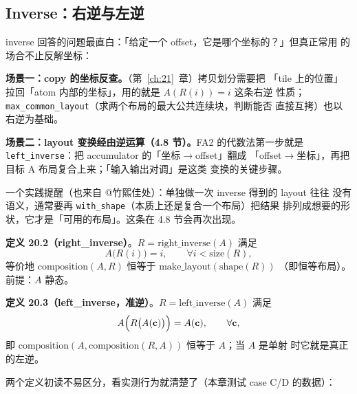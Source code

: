 \subsection{Inverse：右逆与左逆}

inverse 回答的问题最直白：「给定一个 offset，它是哪个坐标的？」但真正常用
的场合不止反解坐标：

\textbf{场景一：copy 的坐标反查。}（第~\ref{ch:21}~章）拷贝划分需要把
「tile 上的位置」拉回「atom 内部的坐标」，用的就是 $A(R(i))=i$ 这条右逆
性质；\texttt{max\_\allowbreak{}common\_\allowbreak{}layout}（求两个布局的最大公共连续块，判断能否
直接互拷）也以右逆为基础。

\textbf{场景二：layout 变换经由逆运算（4.8 节）。}\allowbreak{}FA2 的代数法第一步就是
\texttt{left\_\allowbreak{}inverse}：把 accumulator 的「坐标$\to$offset」翻成
「offset$\to$坐标」，再把目标 A 布局复合上来；「输入输出对调」是这类
变换的关键步骤。

一个实践提醒（也来自 @竹熙佳处）：单独做一次 inverse 得到的 layout 往往
没有语义，通常要再 \texttt{with\_shape}（本质上还是复合一个布局）把结果
排列成想要的形状，它才是「可用的布局」。这条在 4.8 节会再次出现。

\textbf{定义 20.2（right\_inverse）}。$R=\mathrm{right\_inverse}(A)$ 满足
\begin{equation}
  A\bigl(R(i)\bigr) = i , \qquad \forall i < \mathrm{size}(R) ,
  \label{eq:20-right-inv}
\end{equation}
等价地 $\mathrm{composition}(A,R)$ 恒等于 $\mathrm{make\_layout}(\mathrm{shape}(R))$
（即恒等布局）。前提：$A$ 静态。

\textbf{定义 20.3（left\_inverse，准逆）}。$R=\mathrm{left\_inverse}(A)$ 满足
\begin{equation}
  A\Bigl(R\bigl(A(\mathbf{c})\bigr)\Bigr) = A(\mathbf{c}) , \qquad \forall \mathbf{c},
  \label{eq:20-left-inv}
\end{equation}
即 $\mathrm{composition}(A,\mathrm{composition}(R,A))$ 恒等于 $A$；当 $A$ 是单射
时它就是真正的左逆。

两个定义初读不易区分，看实测行为就清楚了（本章测试 case C/D 的数据）：

